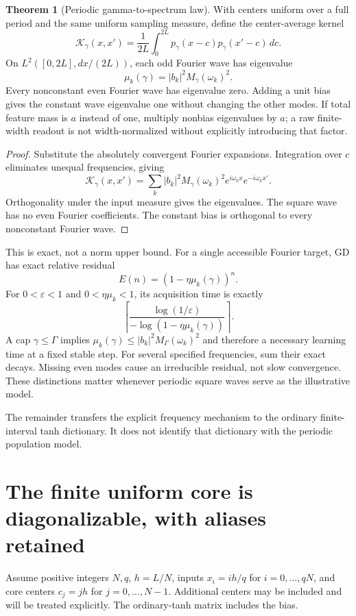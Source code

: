 \documentclass[11pt]{article}
\theoremstyle{definition}
\newtheorem{theorem}[lemma]{Theorem}
\begin{document}
\begin{theorem}[Periodic gamma-to-spectrum law]
With centers uniform over a full period and the same uniform sampling measure,
define the center-average kernel
\[
\mathcal K_\gamma(x,x')
=\frac1{2L}\int_0^{2L}p_\gamma(x-c)p_\gamma(x'-c)\,dc.
\]
On $L^2([0,2L],dx/(2L))$, each odd Fourier wave has eigenvalue
\[
\mu_k(\gamma)=|b_k|^2M_\gamma(\omega_k)^2.
\]
Every nonconstant even Fourier wave has eigenvalue zero. Adding a unit bias
gives the constant wave eigenvalue one without changing the other modes.
If total feature mass is $a$ instead of one, multiply nonbias eigenvalues
by $a$; a raw finite-width readout is not width-normalized without explicitly
introducing that factor.
\end{theorem}
\begin{proof}
Substitute the absolutely convergent Fourier expansions. Integration over
$c$ eliminates unequal frequencies, giving
\[
\mathcal K_\gamma(x,x')
=\sum_k|b_k|^2M_\gamma(\omega_k)^2
e^{i\omega_kx}e^{-i\omega_kx'}.
\]
Orthogonality under the input measure gives the eigenvalues. The square wave
has no even Fourier coefficients. The constant bias is orthogonal to every
nonconstant Fourier wave.
\end{proof}
This is exact, not a norm upper bound. For a single accessible Fourier target,
GD has exact relative residual
\[
E(n)=(1-\eta\mu_k(\gamma))^n.
\]
For $0<\varepsilon<1$ and $0<\eta\mu_k<1$, its acquisition time is exactly
\[
\left\lceil
\frac{\log(1/\varepsilon)}{-\log(1-\eta\mu_k(\gamma))}
\right\rceil.
\]
A cap $\gamma\le\Gamma$ implies
$\mu_k(\gamma)\le|b_k|^2M_\Gamma(\omega_k)^2$ and therefore a necessary
learning time at a fixed stable step. For several specified frequencies,
sum their exact decays. Missing even modes cause an irreducible residual,
not slow convergence. These distinctions matter whenever periodic square
waves serve as the illustrative model.

The remainder transfers the explicit frequency mechanism to the ordinary
finite-interval tanh dictionary. It does not identify that dictionary with
the periodic population model.

\section{The finite uniform core is diagonalizable, with aliases retained}
Assume positive integers $N,q$, $h=L/N$, inputs $x_i=ih/q$ for
$i=0,\ldots,qN$, and core centers $c_j=jh$ for $j=0,\ldots,N-1$.
Additional centers may be included and will be treated explicitly. The
ordinary-tanh matrix includes the bias.
\end{document}
